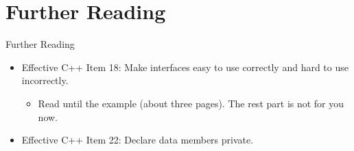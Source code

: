 \documentclass{beamer}
\begin{document}
\section{Further Reading}

\begin{frame}{Further Reading}
    \begin{itemize}
        \item Effective C++ Item 18: Make interfaces easy to use correctly and hard to use incorrectly.
        \begin{itemize}
            \item Read until the  example (about three pages). The rest part is not for you now.
        \end{itemize}
        \item Effective C++ Item 22: Declare data members private.
    \end{itemize}
\end{frame}
\end{document}
